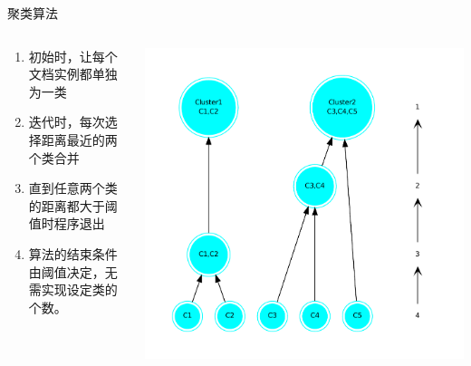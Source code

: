 \begin{frame}[label=sec-2-14]{聚类算法}
\begin{columns}
\begin{column}{0.4\textwidth}
\begin{enumerate}
\item 初始时，让每个文档实例都单独为一类
\item 迭代时，每次选择距离最近的两个类合并
\item 直到任意两个类的距离都大于阈值时程序退出
\item 算法的结束条件由阈值决定，无需实现设定类的个数。
\end{enumerate}

\end{column}

\begin{column}{0.6\textwidth}
\includegraphics[width=\textwidth]{aggloclustering}

\end{column}
\end{columns}
\end{frame}

